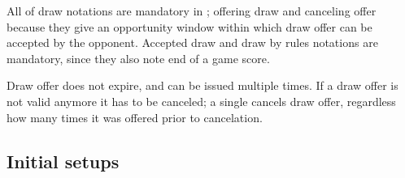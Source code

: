 All of draw notations are mandatory in ; offering draw and canceling
offer because they give an opportunity window within which draw offer can be
accepted by the opponent. Accepted draw and draw by rules notations are mandatory,
since they also note end of a game score.

Draw offer does not expire, and can be issued multiple times. If a draw offer is
not valid anymore it has to be canceled; a single \alg{(-)} cancels draw offer,
regardless how many times it was offered prior to cancelation.

\clearpage %

\subsection*{Initial setups}
\label{sec:Appendix/Summary/Initial setups}

